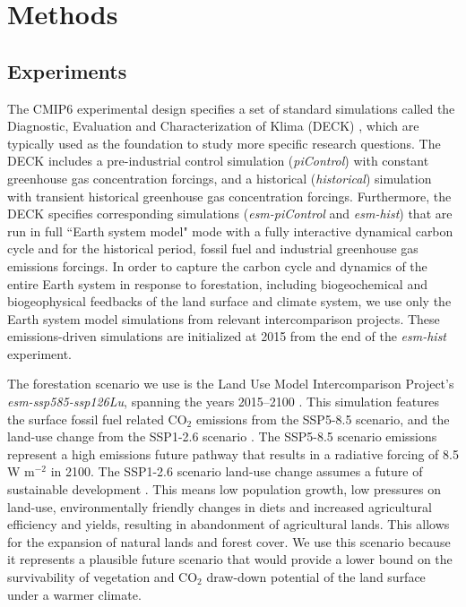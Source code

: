 \documentclass[]{article}
\begin{document}
\section{Methods}

\subsection{Experiments}

The CMIP6 experimental design specifies a set of standard simulations called the Diagnostic, Evaluation and Characterization of Klima (DECK) \parencite{eyring_overview_2016}, which are typically used as the foundation to study more specific research questions.
The DECK includes a pre-industrial control simulation (\textit{piControl}) with constant greenhouse gas concentration forcings, and a historical (\textit{historical}) simulation with transient historical greenhouse gas concentration forcings.
Furthermore, the DECK specifies corresponding simulations (\textit{esm-piControl} and \textit{esm-hist}) that are run in full ``Earth system model" mode with a fully interactive dynamical carbon cycle and for the historical period, fossil fuel and industrial greenhouse gas emissions forcings.
In order to capture the carbon cycle and dynamics of the entire Earth system in response to forestation, including biogeochemical and biogeophysical feedbacks of the land surface and climate system, we use only the Earth system model simulations from relevant intercomparison projects. These emissions-driven simulations are initialized at 2015 from the end of the \textit{esm-hist} experiment.

The forestation scenario we use is the Land Use Model Intercomparison Project's \textit{esm-ssp585-ssp126Lu}, spanning the years 2015--2100 \parencite{lawrence_land_2016}.
This simulation features the surface fossil fuel related CO$_{2}$ emissions from the SSP5-8.5 scenario, and the land-use change from the SSP1-2.6 scenario \parencite{oneill_scenario_2016}.
The SSP5-8.5 scenario emissions represent a high emissions future pathway that results in a radiative forcing of 8.5 W m$^{-2}$ in 2100.
The SSP1-2.6 scenario land-use change assumes a future of sustainable development \parencite{van_vuuren_energy_2017}.
This means low population growth, low pressures on land-use, environmentally friendly changes in diets and increased agricultural efficiency and yields, resulting in abandonment of agricultural lands.
This allows for the expansion of natural lands and forest cover.
We use this scenario because it represents a plausible future scenario that would provide a lower bound on the survivability of vegetation and CO$_2$ draw-down potential of the land surface under a warmer climate.
\end{document}
